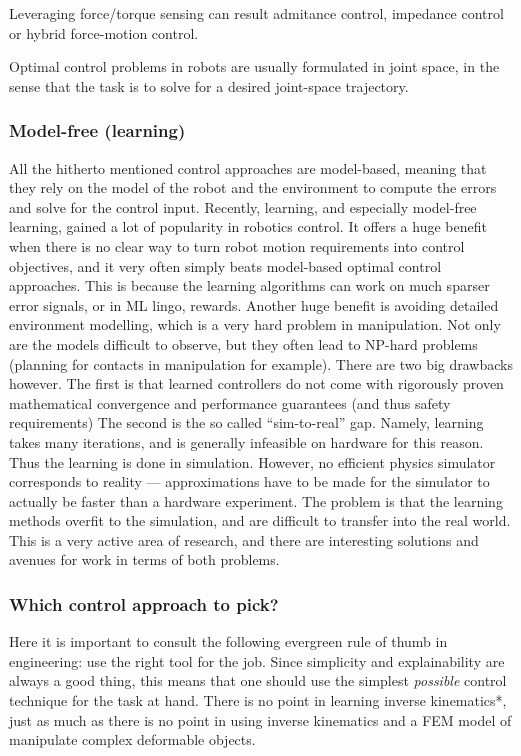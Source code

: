 Leveraging force/torque sensing can result
admitance control, impedance control or hybrid force-motion
control.

Optimal control problems in robots are usually formulated
in joint space, in the sense that the task is to solve for
a desired joint-space trajectory.

\subsubsection{Model-free (learning)}
All the hitherto mentioned control approaches are model-based,
meaning that they rely on the model of the robot
and the environment to compute the errors and solve for the
control input.
Recently, learning, and especially model-free learning,
gained a lot of popularity in robotics control.
It offers a huge benefit when there is no clear
way to turn robot motion requirements into control objectives,
and it very often simply beats model-based optimal control approaches.
This is because the learning algorithms can work on much 
sparser error signals, or in ML lingo, rewards.
Another huge benefit is avoiding detailed environment modelling,
which is a very hard problem in manipulation.
Not only are the models difficult to observe, but they often 
lead to NP-hard problems (planning for contacts in manipulation for example).
There are two big drawbacks however. The first is that 
learned controllers do not come with rigorously proven mathematical 
convergence and performance guarantees (and thus safety requirements)
The second is the so called ``sim-to-real'' gap.
Namely, learning takes many iterations, and is generally infeasible
on hardware for this reason. Thus the learning is done in simulation.
However, no efficient physics simulator corresponds to reality ---
approximations have to be made for the simulator to actually
be faster than a hardware experiment. The problem is that
the learning methods overfit to the simulation, and
are difficult to transfer into the real world.
This is a very active area of research, and there are interesting
solutions and avenues for work in terms of both problems.

\subsubsection{Which control approach to pick?}
Here it is important to consult the following evergreen 
rule of thumb in engineering: use the right tool for the job.
Since simplicity and explainability are always a good thing,
this means that one should use the simplest \textit{possible} control 
technique for the task at hand.
There is no point in learning inverse kinematics*,
just as much as there is no point in using inverse kinematics
and a FEM model of manipulate complex deformable objects.
